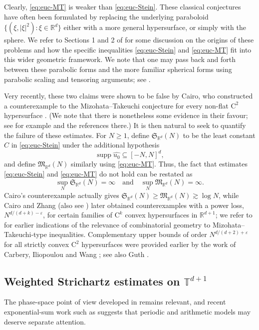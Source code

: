 \documentclass[10pt,a4paper]{amsart}
\numberwithin{equation}{section}
\newcommand{\supp}{\operatorname{supp}}
\renewcommand{\geq}{\geqslant}
\renewcommand{\ge}{\geqslant}
\begin{document}
Clearly, \eqref{eq:euc-MT} is weaker than \eqref{eq:euc-Stein}.
These classical conjectures have often been formulated by replacing the underlying paraboloid $\{(\xi,|\xi|^2):\xi\in\mathbb{R}^d\}$ either with a more general hypersurface, or simply with the sphere. We refer to Sections 1 and 2 of \cite{BGNO} for some discussion on the origins of these problems and how the specific inequalities \eqref{eq:euc-Stein} and \eqref{eq:euc-MT} fit into this wider geometric framework. We note that one may pass back and forth between these parabolic forms and the more familiar spherical forms using parabolic scaling and tensoring arguments; see \cite{Ferrante}.

Very recently, these two claims were shown to be false by Cairo, who constructed a counterexample to the Mizohata--Takeuchi conjecture for every non-flat $\mathrm{C}^2$ hypersurface \cite{Cairo}. (We note that there is nonetheless some evidence in their favour; see for example \cite{Mul,BGNO} and the references there.)
It is then natural to seek to quantify the failure of these estimates. 
For $N\ge1$, define $\mathfrak{S}_{\mathbb{R}^d}(N)$ to be the least constant $C$ in \eqref{eq:euc-Stein} under the additional hypothesis
\[ \supp\widehat{u_0}\subseteq[-N,N]^d, \]
and define $\mathfrak{M}_{\mathbb{R}^d}(N)$ similarly using \eqref{eq:euc-MT}. Thus, the fact that estimates \eqref{eq:euc-Stein} and \eqref{eq:euc-MT} do not hold can be restated as 
\[ \sup_N\mathfrak{S}_{\mathbb{R}^d}(N)=\infty \quad\text{and}\quad \sup_N\mathfrak{M}_{\mathbb{R}^d}(N)=\infty. \]
Cairo's counterexample \cite{Cairo} actually gives $\mathfrak{S}_{\mathbb{R}^d}(N) \geq \mathfrak{M}_{\mathbb{R}^d}(N) \gtrsim \log N$, while Cairo and Zhang \cite{CairoZhang} (also see \cite{Fenves}) later obtained counterexamples with a power loss, $N^{d/(d+k)-\varepsilon}$, for certain families of $\mathrm{C}^k$ convex hypersurfaces in $\mathbb{R}^{d+1}$; we refer to \cite{Carbery09} for earlier indications of the relevance of combinatorial geometry to Mizohata--Takeuchi-type inequalities.
Complementary upper bounds of order $N^{d/(d+2)+\varepsilon}$ for all strictly convex $\mathrm{C}^2$ hypersurfaces were provided earlier by the work of Carbery, Iliopoulou and Wang \cite{CIW}; see also Guth \cite{Guthtalk}. 

\subsection{Weighted Strichartz estimates on \texorpdfstring{$\mathbb{T}^{d+1}$}{torus}}%
The phase-space point of view developed in \cite{BGNO} remains relevant, and recent exponential-sum work such as \cite{Yang} suggests that periodic and arithmetic models may deserve separate attention.
\end{document}
